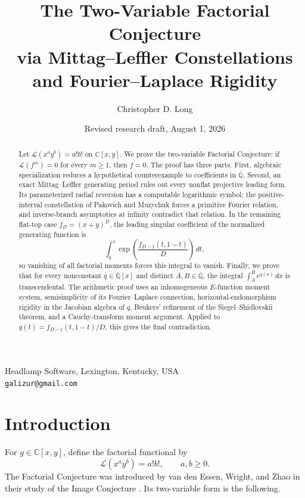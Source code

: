 \documentclass[11pt]{article}
\title{The Two-Variable Factorial Conjecture\\
via Mittag--Leffler Constellations and Fourier--Laplace Rigidity}
\author{Christopher D. Long}
\date{Revised research draft, August 1, 2026}
\numberwithin{equation}{section}
\theoremstyle{definition}
\theoremstyle{remark}
\newcommand{\C}{\mathbb C}
\newcommand{\Qbar}{\overline{\mathbb Q}}
\newcommand{\Lfac}{\mathcal L}
\begin{document}
\maketitle

\begin{center}
\small
Headlamp Software, Lexington, Kentucky, USA\\
\texttt{galizur@gmail.com}
\end{center}

\begin{abstract}
Let $\Lfac(x^a y^b)=a!b!$ on $\C[x,y]$.  We prove the two-variable
Factorial Conjecture: if $\Lfac(f^m)=0$ for every $m\ge1$, then $f=0$.
The proof has three parts.  First, algebraic specialization reduces a
hypothetical counterexample to coefficients in $\Qbar$.  Second, an exact
Mittag--Leffler generating period rules out every nonflat projective leading
form.  Its parameterized radial reversion has a computable logarithmic
symbol; the positive-interval constellation of Pakovich and Muzychuk forces
a primitive Fourier relation, and inverse-branch asymptotics at infinity
contradict that relation.  In the remaining flat-top case
$f_D=(x+y)^D$, the leading singular coefficient of the normalized generating
function is
\[
  \int_0^1\exp\!\left(\frac{f_{D-1}(t,1-t)}D\right)\,dt,
\]
so vanishing of all factorial moments forces this integral to vanish.
Finally, we prove that for every nonconstant $q\in\Qbar[x]$ and distinct
$A,B\in\Qbar$, the integral $\int_A^B e^{q(x)}\,dx$ is transcendental.
The arithmetic proof uses an inhomogeneous $E$-function moment system,
semisimplicity of its Fourier--Laplace connection, horizontal-endomorphism
rigidity in the Jacobian algebra of $q$, Beukers' refinement of the
Siegel--Shidlovskii theorem, and a Cauchy-transform moment argument.  Applied
to $q(t)=f_{D-1}(t,1-t)/D$, this gives the final contradiction.
\end{abstract}

\tableofcontents

\section{Introduction}\label{sec:introduction}

For $g\in\C[x,y]$, define the factorial functional by
\begin{equation}\label{eq:def-L}
  \Lfac(x^a y^b)=a!b!,\qquad a,b\ge0.
\end{equation}
The Factorial Conjecture was introduced by van den Essen, Wright, and Zhao
in their study of the Image Conjecture \cite[\S4]{vdEWZ}.  Its two-variable form
is the following.
\end{document}
